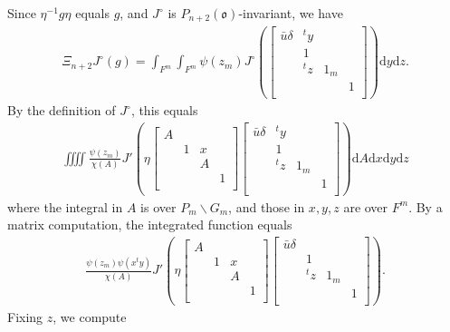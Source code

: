 \documentclass[11pt]{amsart}
\newcommand\oo{\mathfrak{o}}
\newcommand\dr{\mathrm{d}}
\newcommand\1{\mathbf{1}}
\newcommand\bs{\backslash}%
\newcommand\bu{\bar{u}}
\numberwithin{equation}{section}
\begin{document}
Since $\eta^{-1}g\eta$ equals $g$, and $J^\circ$ is $P_{n+2}(\oo)$-invariant, we have
\begin{align*}
\Xi_{n+2} J^\circ(g) = \int_{F^{m}} \int_{F^{m}} \psi(z_m) J^\circ(\begin{bmatrix}
\bu \delta &{}^t y & &  \\
& 1& & \\
& {}^t z & 1_{m}&  \\
& & & 1 \\
\end{bmatrix}) \dr y \dr z.
\end{align*}
By the definition of $J^\circ$, this equals
\begin{align} 
\iiiint \frac{\psi(z_m)}{\chi(A)} J'(\eta \begin{bmatrix}
A& & &  \\
& 1 & x & \\
& &A &  \\
& & &1  \\
\end{bmatrix}\begin{bmatrix}
\bu \delta &{}^t y & &  \\
& 1& & \\
& {}^t z & 1_{m}&  \\
& & & 1 \\
\end{bmatrix}) \dr A \dr x \dr y \dr z \label{eq:WMint1st}
\end{align} 
where the integral in $A$ is over $P_m \bs G_m$, and those in $x, y,z$ are over $F^m$.
By a matrix computation, the integrated function equals
\begin{align*}
\frac{\psi(z_m) \psi(x{}^ty)}{\chi(A)} J'(\eta \begin{bmatrix}
A& & &  \\
& 1 & x  & \\
&  &A&  \\
& & &1  \\
\end{bmatrix}\begin{bmatrix}
\bu \delta  && &  \\
& 1& & \\
& {}^t z & 1_{m}&  \\
& & & 1 \\
\end{bmatrix}). 
\end{align*}
Fixing $z$, we compute 
\end{document}
